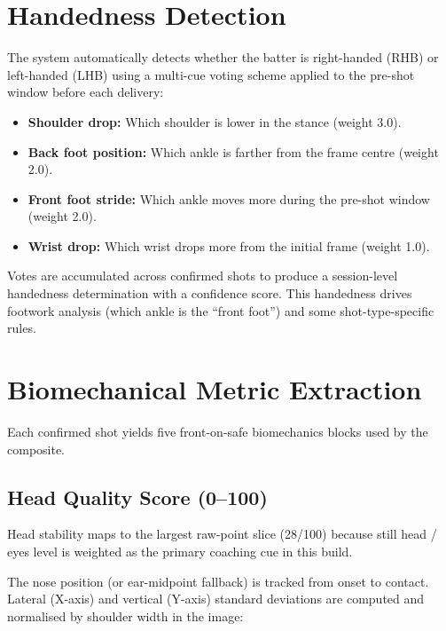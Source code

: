 \begin{justify}
\section{Handedness Detection}

\par The system automatically detects whether the batter is right-handed (RHB) or left-handed (LHB) using a multi-cue voting scheme applied to the pre-shot window before each delivery:

\begin{itemize}
    \item \textbf{Shoulder drop:} Which shoulder is lower in the stance (weight 3.0).
    \item \textbf{Back foot position:} Which ankle is farther from the frame centre (weight 2.0).
    \item \textbf{Front foot stride:} Which ankle moves more during the pre-shot window (weight 2.0).
    \item \textbf{Wrist drop:} Which wrist drops more from the initial frame (weight 1.0).
\end{itemize}

\par Votes are accumulated across confirmed shots to produce a session-level handedness determination with a confidence score. This handedness drives footwork analysis (which ankle is the ``front foot'') and some shot-type-specific rules.

\section{Biomechanical Metric Extraction}

\par Each confirmed shot yields five front-on-safe biomechanics blocks used by the composite.

\subsection{Head Quality Score (0--100)}

\par Head stability maps to the largest raw-point slice (28/100) because still head / eyes level is weighted as the primary coaching cue in this build.

\par The nose position (or ear-midpoint fallback) is tracked from onset to contact. Lateral (X-axis) and vertical (Y-axis) standard deviations are computed and normalised by shoulder width in the image:


\end{justify}

